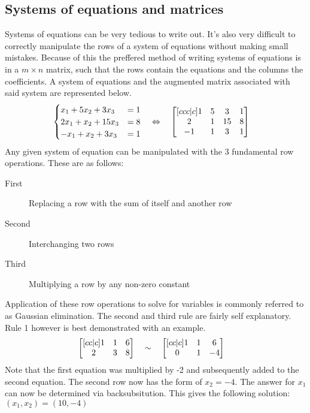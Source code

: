 \documentclass[11pt, a4paper]{article}
\begin{document}
\subsection{Systems of equations and matrices}
Systems of equations can be very tedious to write out. It's also very difficult
to correctly manipulate the rows of a system of equations without making small mistakes.
Because of this the preffered method of writing systems of equations is in a $m\times n$ matrix,
such that the rows contain the equations and the columns the coefficients. A system of
equations and the augmented matrix associated with said system are represented below.
\\
\begin{align*}
    \begin{cases} 
        x_1 + 5x_2 + 3x_3 &= 1 \\
        2x_1 + x_2 + 15x_3 &= 8 \\
        -x_1 + x_2 + 3x_3 &= 1 \\
       \end{cases}\hspace{-1em}
    \qquad &\Leftrightarrow \quad
    \begin{bmatrix}[ccc|c]
       1 & 5 & 3 & 1\\
       2 & 1 & 15 & 8\\
       -1 & 1 & 3 & 1\\
    \end{bmatrix}      
\end{align*}
Any given system of equation can be manipulated with the 3 fundamental row operations.
These are as follows:
\begin{description}
    \item[First] Replacing a row with the sum of itself and another row
    \item[Second] Interchanging two rows
    \item[Third]  Multiplying a row by any non-zero constant
\end{description}
Application of these row operations to solve for variables is commonly referred to as
Gaussian elimination. The second and third rule are fairly self explanatory.
Rule 1 however is best demonstrated with an example.
\begin{align*}
    \begin{bmatrix}[cc|c]
        1 & 1 & 6\\
        2 & 3 & 8\\
    \end{bmatrix}\hspace{-1em}
    \qquad &\sim \quad
    \begin{bmatrix}[cc|c]
       1 & 1 & 6 \\
       0 & 1 & -4 \\
    \end{bmatrix}      
\end{align*}
Note that the first equation was multiplied by -2 and subsequently added to the second equation.
The second row now has the form of $x_2 = -4$. The answer for $x_1$ can now be determined via
backsubsitution. This gives the following solution: $(x_1, x_2) = (10, -4)$
\end{document}
